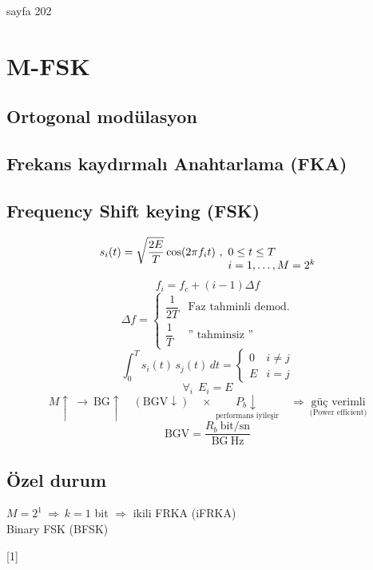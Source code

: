\documentclass[11pt,a4paper]{article}
\begin{document}

\begin{center}sayfa 202\end{center}

\section{M-FSK}
\subsection{Ortogonal modülasyon}
\subsection{Frekans kaydırmalı Anahtarlama (FKA)}
\subsection{Frequency Shift keying (FSK)}
\[ s_i(t)=\sqrt{\frac{2E}{T}}\cos(2\pi f_it)\ ,\ \begin{array}[t]{@{}l@{}}0\le t\le T\\ i=1,\dots,M=2^k\end{array} \]
\[ f_i=f_c+(i-1)\Delta f \]
\[ \Delta f=\begin{cases}\dfrac{1}{2T} & \text{Faz tahminli demod.}\\[6pt] \dfrac{1}{T} & \text{'' tahminsiz ''}\end{cases} \]
\[ \int_0^T s_i(t)\,s_j(t)\,dt=\begin{cases}0 & i\ne j\\ E & i=j\end{cases} \]
\[ \forall_i\ \ E_i=E \]
\[ M\uparrow\ \rightarrow\ \mathrm{BG}\uparrow\quad(\mathrm{BGV}\downarrow)\quad\times\ \underset{\text{performans iyileşir}}{P_b\downarrow}\quad\Rightarrow\ \underset{\text{(Power efficient)}}{\text{güç verimli}} \]
\[ \mathrm{BGV}=\frac{R_b\ \text{bit/sn}}{\mathrm{BG}\ \text{Hz}} \]

\subsection{Özel durum}
$M=2^1\ \Rightarrow\ k=1$ bit $\Rightarrow$ ikili FRKA (iFRKA)\\
\hspace*{4em}Binary FSK \quad (BFSK)

[1]
\end{document}
